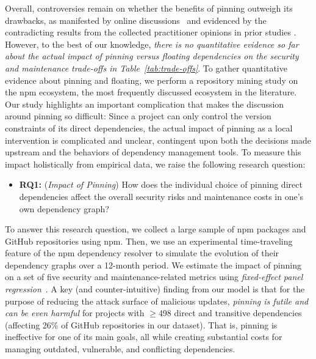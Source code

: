 Overall, controversies remain on whether the benefits of pinning outweigh its drawbacks, as manifested by online discussions~\cite{facts-vs-feelings, renovate-pinning, pinning-only-work} and evidenced by the contradicting results from the collected practitioner opinions in prior studies \cite{DBLP:journals/tse/JafariCAST22, DBLP:conf/sp/LadisaPMB23}.
However, to the best of our knowledge,  \textit{there is no quantitative evidence so far about the actual impact of pinning versus floating dependencies on the security and maintenance trade-offs in Table~\ref{tab:trade-offs}}.
To gather quantitative evidence about pinning and floating, we perform a repository mining study on the npm ecosystem, the most frequently discussed ecosystem in the literature.
Our study highlights an important complication that makes the discussion around pinning so difficult: Since a project can only control the version constraints of its direct dependencies, the actual impact of pinning as a local intervention is complicated and unclear, contingent upon both the decisions made upstream and the behaviors of dependency management tools. 
To measure this impact holistically from empirical data, we raise the following research question:
\begin{itemize}[leftmargin=20pt]
    \item \textbf{RQ1:} (\emph{Impact of Pinning}) How does the individual choice of pinning direct dependencies affect the overall security risks and maintenance costs in one's own dependency graph?
\end{itemize}
To answer this research question, we collect a large sample of npm packages and GitHub repositories using npm.
Then, we use an experimental time-traveling feature of the npm dependency resolver to simulate the evolution of their dependency graphs over a 12-month period.
We estimate the impact of pinning on a set of five security and maintenance-related metrics using \emph{fixed-effect panel regression}~\cite{bruderl2015fixed, hanck2021introduction}.
A key (and counter-intuitive) finding from our model is that for the purpose of reducing the attack surface of malicious updates, \textit{pinning is futile and can be even harmful} for projects with $\ge$498 direct and transitive dependencies (affecting 26\% of GitHub repositories in our dataset). That is, pinning is ineffective for one of its main goals, all while creating substantial costs for managing outdated, vulnerable, and conflicting dependencies. 

